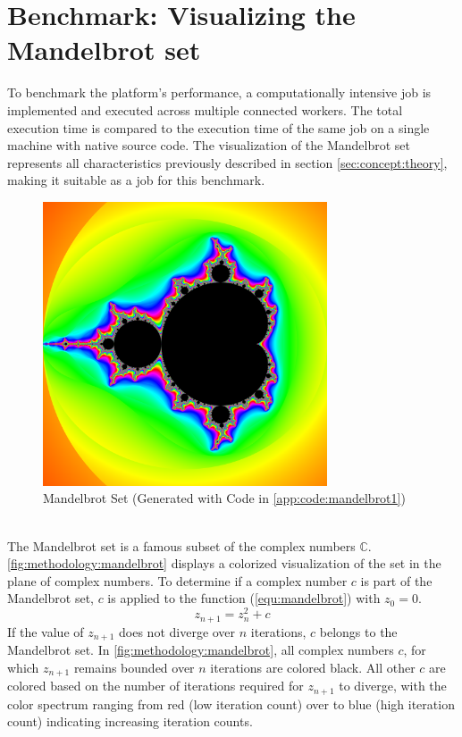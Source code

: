 \section{Benchmark: Visualizing the Mandelbrot set}
\label{sec:methodology:benchmark}
To benchmark the platform's performance, a computationally intensive job is implemented and executed across multiple connected workers. The total execution time is compared to the execution time of the same job on a single machine with native source code. The visualization of the Mandelbrot set represents all characteristics previously described in section \ref{sec:concept:theory}, making it suitable as a job for this benchmark.
\newpage
\begin{figure}[htbp]
  \centering
  \includegraphics[width=0.75\textwidth]{gfx/figures/mandelbrot.png}
  \caption{Mandelbrot Set (Generated with Code in \autoref{app:code:mandelbrot1})}
  \label{fig:methodology:mandelbrot}
\end{figure}
~\\
The Mandelbrot set is a famous subset of the complex numbers $\mathbb{C}$. \autoref{fig:methodology:mandelbrot} displays a colorized visualization of the set in the plane of complex numbers. To determine if a complex number $c$ is part of the Mandelbrot set, $c$ is applied to the function (\ref{equ:mandelbrot}) with $z_{0}=0$.
\begin{equation}
  z_{n+1} = z_{n}^2 + c
  \label{equ:mandelbrot}
\end{equation}
If the value of $z_{n+1}$ does not diverge over $n$ iterations, $c$ belongs to the Mandelbrot set. In \autoref{fig:methodology:mandelbrot}, all complex numbers $c$, for which $z_{n+1}$ remains bounded over $n$ iterations are colored black. All other $c$ are colored based on the number of iterations required for $z_{n+1}$ to diverge, with the color spectrum ranging from red (low iteration count) over to blue (high iteration count) indicating increasing iteration counts.

